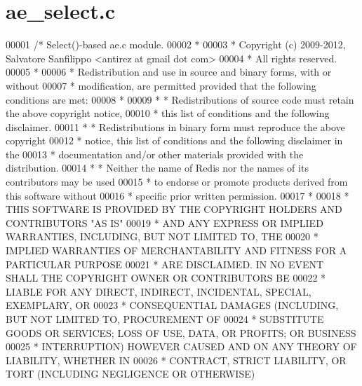 \hypertarget{ae__select_8c_source}{}\section{ae\+\_\+select.\+c}
\label{ae__select_8c_source}

\begin{DoxyCode}
00001 \textcolor{comment}{/* Select()-based ae.c module.}
00002 \textcolor{comment}{ *}
00003 \textcolor{comment}{ * Copyright (c) 2009-2012, Salvatore Sanfilippo <antirez at gmail dot com>}
00004 \textcolor{comment}{ * All rights reserved.}
00005 \textcolor{comment}{ *}
00006 \textcolor{comment}{ * Redistribution and use in source and binary forms, with or without}
00007 \textcolor{comment}{ * modification, are permitted provided that the following conditions are met:}
00008 \textcolor{comment}{ *}
00009 \textcolor{comment}{ *   * Redistributions of source code must retain the above copyright notice,}
00010 \textcolor{comment}{ *     this list of conditions and the following disclaimer.}
00011 \textcolor{comment}{ *   * Redistributions in binary form must reproduce the above copyright}
00012 \textcolor{comment}{ *     notice, this list of conditions and the following disclaimer in the}
00013 \textcolor{comment}{ *     documentation and/or other materials provided with the distribution.}
00014 \textcolor{comment}{ *   * Neither the name of Redis nor the names of its contributors may be used}
00015 \textcolor{comment}{ *     to endorse or promote products derived from this software without}
00016 \textcolor{comment}{ *     specific prior written permission.}
00017 \textcolor{comment}{ *}
00018 \textcolor{comment}{ * THIS SOFTWARE IS PROVIDED BY THE COPYRIGHT HOLDERS AND CONTRIBUTORS "AS IS"}
00019 \textcolor{comment}{ * AND ANY EXPRESS OR IMPLIED WARRANTIES, INCLUDING, BUT NOT LIMITED TO, THE}
00020 \textcolor{comment}{ * IMPLIED WARRANTIES OF MERCHANTABILITY AND FITNESS FOR A PARTICULAR PURPOSE}
00021 \textcolor{comment}{ * ARE DISCLAIMED. IN NO EVENT SHALL THE COPYRIGHT OWNER OR CONTRIBUTORS BE}
00022 \textcolor{comment}{ * LIABLE FOR ANY DIRECT, INDIRECT, INCIDENTAL, SPECIAL, EXEMPLARY, OR}
00023 \textcolor{comment}{ * CONSEQUENTIAL DAMAGES (INCLUDING, BUT NOT LIMITED TO, PROCUREMENT OF}
00024 \textcolor{comment}{ * SUBSTITUTE GOODS OR SERVICES; LOSS OF USE, DATA, OR PROFITS; OR BUSINESS}
00025 \textcolor{comment}{ * INTERRUPTION) HOWEVER CAUSED AND ON ANY THEORY OF LIABILITY, WHETHER IN}
00026 \textcolor{comment}{ * CONTRACT, STRICT LIABILITY, OR TORT (INCLUDING NEGLIGENCE OR OTHERWISE)}

\end{DoxyCode}
